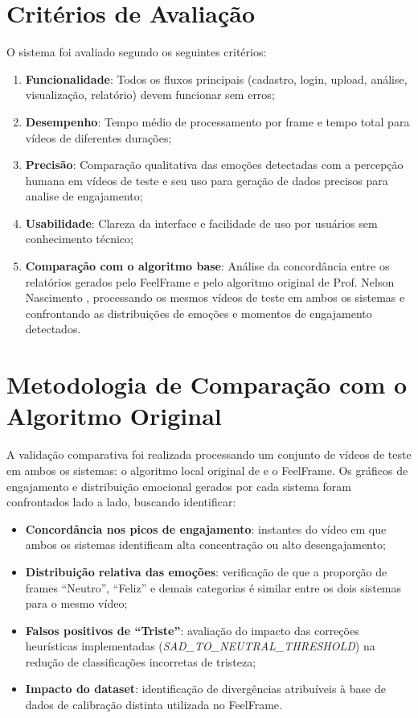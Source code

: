 \documentclass[
	12pt,
	openright,
	oneside,
	a4paper,
	english,
	brazil
	]{abntex2}
\begin{document}
\section{Critérios de Avaliação}

O sistema foi avaliado segundo os seguintes critérios:

\begin{enumerate}
    \item \textbf{Funcionalidade}: Todos os fluxos principais (cadastro, login, upload, análise, visualização, relatório) devem funcionar sem erros;
    \item \textbf{Desempenho}: Tempo médio de processamento por frame e tempo total para vídeos de diferentes durações;
    \item \textbf{Precisão}: Comparação qualitativa das emoções detectadas com a percepção humana em vídeos de teste e seu uso para geração de dados precisos para analise de engajamento;
    \item \textbf{Usabilidade}: Clareza da interface e facilidade de uso por usuários sem conhecimento técnico;
    \item \textbf{Comparação com o algoritmo base}: Análise da concordância entre os relatórios gerados pelo FeelFrame e pelo algoritmo original de Prof. Nelson Nascimento \cite{nascimento2024nelson}, processando os mesmos vídeos de teste em ambos os sistemas e confrontando as distribuições de emoções e momentos de engajamento detectados.
\end{enumerate}

\section{Metodologia de Comparação com o Algoritmo Original}

A validação comparativa foi realizada processando um conjunto de vídeos de teste em ambos os sistemas: o algoritmo local original de \cite{nascimento2024nelson} e o FeelFrame. Os gráficos de engajamento e distribuição emocional gerados por cada sistema foram confrontados lado a lado, buscando identificar:

\begin{itemize}
    \item \textbf{Concordância nos picos de engajamento}: instantes do vídeo em que ambos os sistemas identificam alta concentração ou alto desengajamento;
    \item \textbf{Distribuição relativa das emoções}: verificação de que a proporção de frames ``Neutro'', ``Feliz'' e demais categorias é similar entre os dois sistemas para o mesmo vídeo;
    \item \textbf{Falsos positivos de ``Triste''}: avaliação do impacto das correções heurísticas implementadas (\textit{SAD\_TO\_NEUTRAL\_THRESHOLD}) na redução de classificações incorretas de tristeza;
    \item \textbf{Impacto do dataset}: identificação de divergências atribuíveis à base de dados de calibração distinta utilizada no FeelFrame.
\end{itemize}
\end{document}
